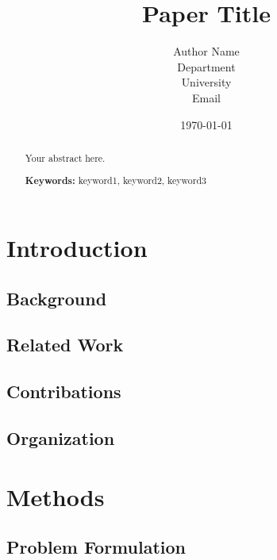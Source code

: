 \documentclass[12pt]{article}
\title{Paper Title}
\author{Author Name\\Department\\University\\Email}
\date{\today}
\begin{document}
\maketitle

\begin{abstract}

Your abstract here.

\textbf{Keywords:} keyword1, keyword2, keyword3
\end{abstract}

\section{Introduction}
\label{sec:introduction}


\subsection{Background}

\subsection{Related Work}

\subsection{Contribations}

\subsection{Organization}

\section{Methods}
\label{sec:methods}


\subsection{Problem Formulation}
\end{document}
